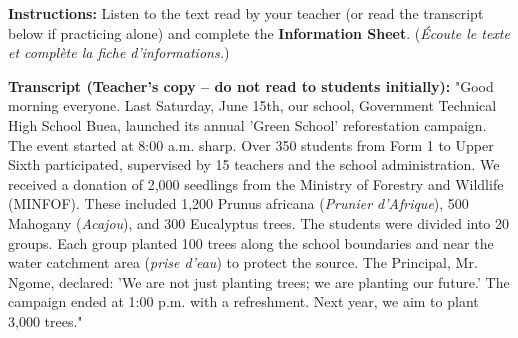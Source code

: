 \documentclass[11pt]{article}
\begin{document}
\begin{exercice}
\textbf{Instructions:} Listen to the text read by your teacher (or read the transcript below if practicing alone) and complete the \textbf{Information Sheet}. (\emph{Écoute le texte et complète la fiche d'informations.})

\textbf{Transcript (Teacher's copy -- do not read to students initially):}
"Good morning everyone. Last Saturday, June 15th, our school, Government Technical High School Buea, launched its annual 'Green School' reforestation campaign. The event started at 8:00 a.m. sharp. Over 350 students from Form 1 to Upper Sixth participated, supervised by 15 teachers and the school administration. We received a donation of 2,000 seedlings from the Ministry of Forestry and Wildlife (MINFOF). These included 1,200 Prunus africana (\textit{Prunier d'Afrique}), 500 Mahogany (\textit{Acajou}), and 300 Eucalyptus trees. The students were divided into 20 groups. Each group planted 100 trees along the school boundaries and near the water catchment area (\textit{prise d'eau}) to protect the source. The Principal, Mr. Ngome, declared: 'We are not just planting trees; we are planting our future.' The campaign ended at 1:00 p.m. with a refreshment. Next year, we aim to plant 3,000 trees."


\end{exercice}
\end{document}
